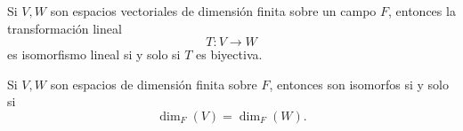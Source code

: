 \documentclass[12pt,a4paper]{book}
\begin{document}
    \begin{proposicion}
    \label{prop:30}
        Si $V, W$ son espacios vectoriales de dimensión finita sobre un campo $F$, entonces la transformación lineal
        \begin{equation*}
            T: V \to W
        \end{equation*}
        es isomorfismo lineal si y solo si $T$ es biyectiva.
    \end{proposicion}

    \begin{proposicion}
    \label{prop:31}
        Si $V, W$ son espacios de dimensión finita sobre $F$, entonces son isomorfos si y solo si
        \begin{equation*}
            \dim_{F}(V) = \dim_{F}(W).
        \end{equation*}
    \end{proposicion}
\end{document}
